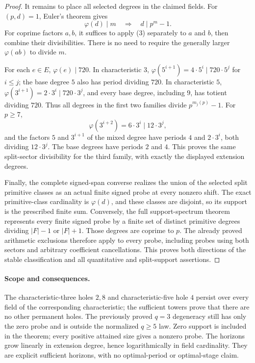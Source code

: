\documentclass[11pt]{article}
\begin{document}
\begin{proof}
It remains to place all selected degrees in the claimed fields.
For \((p,d)=1\), Euler's theorem gives
\[
       \varphi(d)\mid m\quad\Longrightarrow\quad d\mid p^m-1. \tag{3}
\]
For coprime factors \(a,b\), it suffices to apply (3) separately
to \(a\) and \(b\), then combine their divisibilities. There is no
need to require the generally larger \(\varphi(ab)\) to divide \(m\).

For each \(e\in E\), \(\varphi(e)\mid720\).
In characteristic \(3\),
\(\varphi(5^{i+1})=4\cdot5^i\mid720\cdot5^j\) for \(i\le j\);
the base degree \(5\) also has period dividing \(720\).
In characteristic \(5\),
\(\varphi(3^{i+1})=2\cdot3^i\mid720\cdot3^j\), and every base
degree, including \(9\), has totient dividing \(720\).
Thus all degrees in the first two families divide
\(p^{m_j(p)}-1\).
For \(p\ge7\),
\[
 \varphi(3^{i+2})=6\cdot3^i\mid12\cdot3^j,
\]
and the factors \(5\) and \(3^{i+1}\) of the mixed degree have
periods \(4\) and \(2\cdot3^i\), both dividing \(12\cdot3^j\).
The base degrees have periods \(2\) and \(4\). This proves the same
split-sector divisibility for the third family, with exactly the
displayed extension degrees.

Finally, the complete signed-span converse realizes the union of
the selected split primitive classes as an actual finite signed
probe at every nonzero shift. The exact primitive-class cardinality
is \(\varphi(d)\), and these classes are disjoint, so its support is
the prescribed finite sum. Conversely, the full support-spectrum
theorem represents every finite signed probe by a finite set of
distinct primitive degrees dividing \(|F|-1\) or \(|F|+1\).
Those degrees are coprime to \(p\). The already proved arithmetic
exclusions therefore apply to every probe, including probes using
both sectors and arbitrary coefficient cancellations. This proves
both directions of the stable classification and all quantitative
and split-support assertions.
\end{proof}

\paragraph{Scope and consequences.}
The characteristic-three holes \(2,8\) and characteristic-five hole
\(4\) persist over every field of the corresponding characteristic;
the sufficient towers prove that there are no other permanent holes.
The previously proved \(q=3\) degeneracy still has only the zero probe
and is outside the normalized \(q\ge5\) law. Zero support is included
in the theorem; every positive attained size gives a nonzero probe.
The horizons grow linearly in extension degree, hence logarithmically
in field cardinality. They are explicit sufficient horizons, with no
optimal-period or optimal-stage claim.
\end{document}
